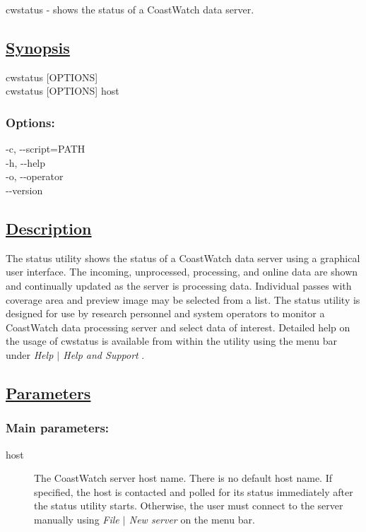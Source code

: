    cwstatus - shows the status of a CoastWatch data server.  
\subsection*{\underline{Synopsis}}


  cwstatus [OPTIONS] \\ 
 cwstatus [OPTIONS] host 
\subsubsection*{Options:}


  -c, -{-}script=PATH \\ 
 -h, -{-}help \\ 
 -o, -{-}operator \\ 
 -{-}version \\ 

\subsection*{\underline{Description}}


  The status utility shows the status of a CoastWatch data server using a graphical user interface. The incoming, unprocessed, processing, and online data are shown and continually updated as the server is processing data. Individual passes with coverage area and preview image may be selected from a list. The status utility is designed for use by research personnel and system operators to monitor a CoastWatch data processing server and select data of interest. Detailed help on the usage of cwstatus is available from within the utility using the menu bar under \emph{Help $|$ Help and Support}
.
\subsection*{\underline{Parameters}}
\subsubsection*{Main parameters:}
\begin{description}
\item[ host ] The CoastWatch server host name. There is no default host name. If specified, the host is contacted and polled for its status immediately after the status utility starts. Otherwise, the user must connect to the server manually using \emph{File $|$ New server}
 on the menu bar. 

\end{description}
